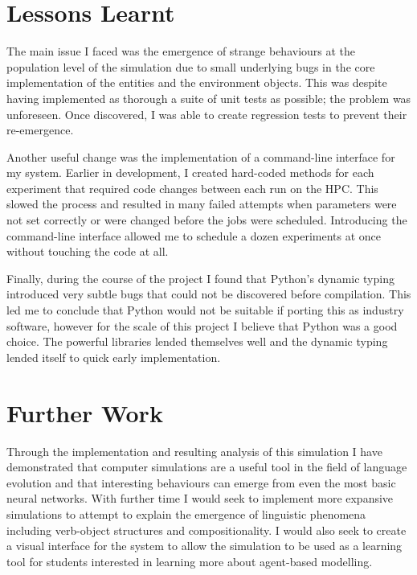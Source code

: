 \documentclass[12pt,a4paper,twoside,openright]{report}
\begin{document}
\section{Lessons Learnt}

The main issue I faced was the emergence of strange behaviours at the population level of the simulation due to small underlying bugs in the core implementation of the entities and the environment objects. This was despite having implemented as thorough a suite of unit tests as possible; the problem was unforeseen. Once discovered, I was able to create regression tests to prevent their re-emergence.

Another useful change was the implementation of a command-line interface for my system. Earlier in development, I created hard-coded methods for each experiment that required code changes between each run on the HPC. This slowed the process and resulted in many failed attempts when parameters were not set correctly or were changed before the jobs were scheduled. Introducing the command-line interface allowed me to schedule a dozen experiments at once without touching the code at all.

Finally, during the course of the project I found that Python's dynamic typing introduced very subtle bugs that could not be discovered before compilation. This led me to conclude that Python would not be suitable if porting this as industry software, however for the scale of this project I believe that Python was a good choice. The powerful libraries lended themselves well and the dynamic typing lended itself to quick early implementation.

\section{Further Work}

Through the implementation and resulting analysis of this simulation I have demonstrated that computer simulations are a useful tool in the field of language evolution and that interesting behaviours can emerge from even the most basic neural networks. With further time I would seek to implement more expansive simulations to attempt to explain the emergence of linguistic phenomena including verb-object structures and compositionality. I would also seek to create a visual interface for the system to allow the simulation to be used as a learning tool for students interested in learning more about agent-based modelling. 



\end{document}
